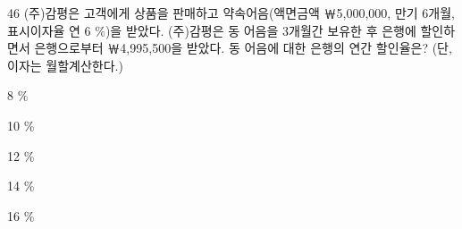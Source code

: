 \begin{question}{46}
(주)감평은 고객에게 상품을 판매하고 약속어음(액면금액 ￦5,000,000, 만기 6개월, 표시이자율 연 6 \%)을 받았다. (주)감평은 동 어음을 3개월간 보유한 후 은행에 할인하면서 은행으로부터 ￦4,995,500을 받았다. 동 어음에 대한 은행의 연간 할인율은? (단, 이자는 월할계산한다.)
\begin{choices}
  \item 8 \%
  \item 10 \%
  \item 12 \%
  \item 14 \%
  \item 16 \%
\end{choices}
\end{question}
